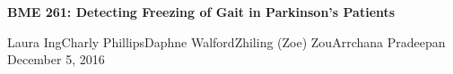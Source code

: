 \documentclass[titlepage]{article}
\begin{document}
\begin{center}
\vspace*{\fill}
\LARGE{\textbf{BME 261: Detecting Freezing of Gait in Parkinson's Patients}}
\vspace{1cm}

\Large{Laura Ing\linebreak Charly Phillips\linebreak Daphne Walford\linebreak Zhiling (Zoe) Zou\linebreak Arrchana Pradeepan \linebreak\linebreak December 5, 2016}
\end{center}
\vspace*{\fill}
\clearpage

\tableofcontents
\end{document}
